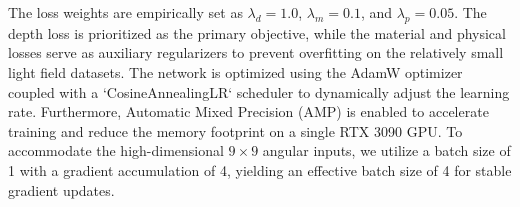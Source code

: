 The loss weights are empirically set as $\lambda_{d} = 1.0$, $\lambda_{m} = 0.1$, and $\lambda_{p} = 0.05$. The depth loss is prioritized as the primary objective, while the material and physical losses serve as auxiliary regularizers to prevent overfitting on the relatively small light field datasets. The network is optimized using the AdamW optimizer coupled with a `CosineAnnealingLR` scheduler to dynamically adjust the learning rate. Furthermore, Automatic Mixed Precision (AMP) is enabled to accelerate training and reduce the memory footprint on a single RTX 3090 GPU. To accommodate the high-dimensional $9 \times 9$ angular inputs, we utilize a batch size of 1 with a gradient accumulation of 4, yielding an effective batch size of 4 for stable gradient updates.

